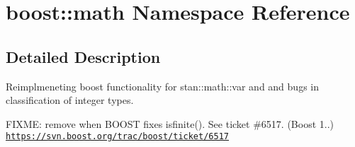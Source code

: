 \hypertarget{namespaceboost_1_1math}{}\section{boost\+:\+:math Namespace Reference}
\label{namespaceboost_1_1math}


\subsection{Detailed Description}
Reimplmeneting boost functionality for {\ttfamily stan\+::math\+::var} and and bugs in classification of integer types.

F\+I\+X\+M\+E\+: remove when B\+O\+O\+S\+T fixes isfinite(). See ticket \#6517. (Boost 1..) \href{https://svn.boost.org/trac/boost/ticket/6517}{\tt https\+://svn.\+boost.\+org/trac/boost/ticket/6517} 